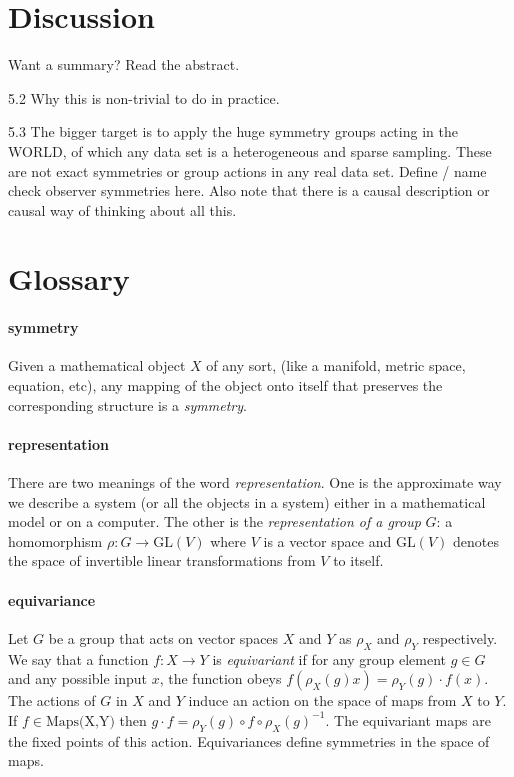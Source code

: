 \documentclass{article}
\theoremstyle{plain}
\theoremstyle{definition}
\theoremstyle{remark}
\begin{document}
\section{Discussion}\label{sec:summary}

Want a summary? Read the abstract.

   5.2 Why this is non-trivial to do in practice.
   
   5.3 The bigger target is to apply the huge symmetry groups acting in the WORLD, of which any data set is a heterogeneous and sparse sampling. These are not exact symmetries or group actions in any real data set. Define / name check observer symmetries here. Also note that there is a causal description or causal way of thinking about all this.




\newpage\appendix\onecolumn
\section{Glossary}
\paragraph{symmetry}
Given a mathematical object $X$ of any sort, (like a manifold, metric space, equation, etc), any mapping of the object onto itself that preserves the corresponding structure is a \emph{symmetry}.

\paragraph{representation}
There are two meanings of the word \emph{representation}. One is the approximate way we describe a system (or all the objects in a system) either in a mathematical model or on a computer.
The other is the \emph{representation of a group} $G$: a homomorphism $\rho: G\to \text{GL}(V)$ where $V$ is a vector space and $\text{GL}(V)$ denotes the space of invertible linear transformations from $V$ to itself.

\paragraph{equivariance}
Let $G$ be a group that acts on vector spaces $X$ and $Y$ as $\rho_X$ and $\rho_Y$ respectively. We say that a function $f:X\to Y$ is \emph{equivariant} if for any group element $g\in G$ and any possible input $x$, the function obeys $f( \rho_X(g) x) = \rho_Y(g)\cdot f(x)$.
The actions of $G$ in $X$ and $Y$ induce an action on the space of maps from $X$ to $Y$. If $f\in \text{Maps(X,Y)}$ then $g\cdot f = \rho_Y(g)\circ f \circ \rho_X(g)^{-1}$.
The equivariant maps are the fixed points of this action.
Equivariances define symmetries in the space of maps. 
\end{document}
